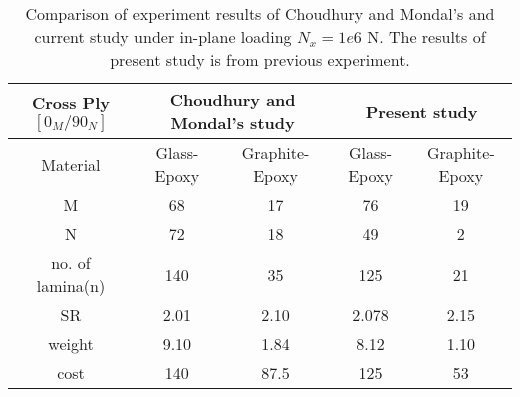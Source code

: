 \begin{table}[t]
\caption{Comparison of experiment results of Choudhury and
Mondal's\cite{choudhury2019failure} and current study under in-plane loading
$N_x=1e6$ N. The results of present study is from previous experiment.}
\centering
\begin{adjustbox}{width=0.5\textwidth}
	\begin{tabular}{c|cc|cc}
		\toprule
		Cross Ply $[0_M/90_N]$         & \multicolumn{2}{c}{Choudhury and Mondal's study} & \multicolumn{2}{c}{Present study} \\
		\midrule																								  
		 Material       &  Glass-Epoxy & Graphite-Epoxy  & Glass-Epoxy & Graphite-Epoxy      \\ 
			  M         &  68          &    17           &  76		    &  19             \\
			  N         &  72          &    18           &  49		    &  2              \\
	no. of lamina(n)    &  140         &    35           &  125	        &  21                     \\
			 SR         &  2.01        &    2.10         &  2.078	    &  2.15            \\
		 weight         &  9.10        &    1.84         &  8.12	    &  1.10           \\
		 cost           &  140         &    87.5         &  125	        &  53           \\
		\bottomrule
	\end{tabular}
\end{adjustbox}
\label{tab:comparsion}
\end{table}
